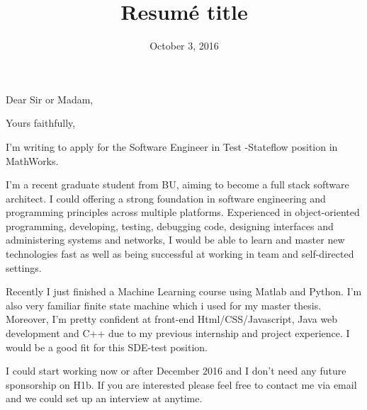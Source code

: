 \documentclass[11pt,a4paper,sans]{moderncv}        %
\title{Resumé title}                               %
\begin{document}
\date{October 3, 2016}
\opening{Dear Sir or Madam,}
\closing{Yours faithfully,}
\makelettertitle

I'm writing to apply for the Software Engineer in Test -Stateflow position in MathWorks.

I'm a recent graduate student from BU, aiming to become a full stack software architect. I could offering a strong foundation in software engineering and programming principles across multiple platforms. Experienced in object-oriented programming, developing, testing, debugging code, designing interfaces and administering systems and networks, 	I would be able to learn and master new technologies fast as well as being successful at working in team and self-directed settings.

Recently I just finished a Machine Learning course using Matlab and Python. I'm also very familiar finite state machine which i used for my master thesis. Moreover, I'm pretty confident at front-end Html/CSS/Javascript, Java web development and C++ due to my previous internship and project experience. I would be a good fit for this SDE-test position.

I could start working now or after December 2016 and I don't need any future sponsorship on H1b. If you are interested please feel free to contact me via email and we could set up an interview at anytime.





\makeletterclosing
\end{document}
